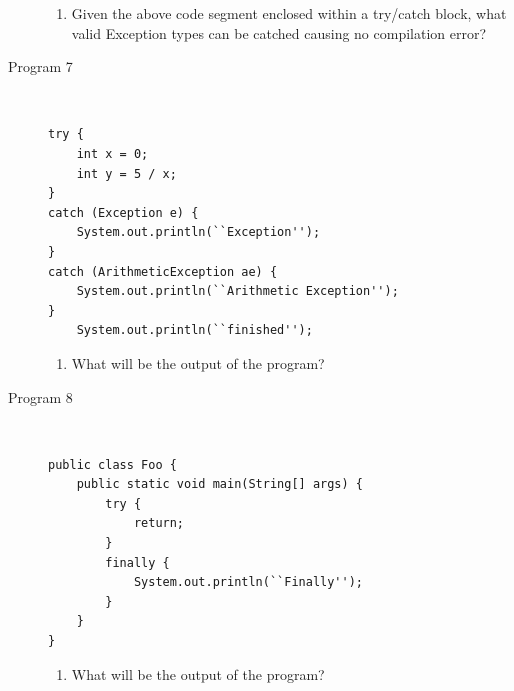 \documentclass[11pt,a4paper]{article}
\def\AnswerBox{\fbox{\begin{minipage}{4in}\hfill\vspace{0.5in}\end{minipage}}}
\begin{document}
\begin{description}
\begin{enumerate}[label=\bfseries Q\arabic*:]\itemsep10pt
\item Given the above code segment enclosed within a try/catch block, what valid Exception types can be catched causing no compilation error? 
\end{enumerate}

\item [Program 7] \
\begin{lstlisting}
try { 
    int x = 0; 
    int y = 5 / x; 
} 
catch (Exception e) {
    System.out.println(``Exception''); 
} 
catch (ArithmeticException ae) {
    System.out.println(``Arithmetic Exception''); 
} 
    System.out.println(``finished'');
\end{lstlisting}

\AnswerBox

\begin{enumerate}[label=\bfseries Q\arabic*:]\itemsep10pt
        \item What will be the output of the program?
    \end{enumerate}

\item [Program 8] \
\begin{lstlisting}
public class Foo {  
    public static void main(String[] args) {
        try { 
            return; 
        } 
        finally {
            System.out.println(``Finally''); 
        } 
    }
}
\end{lstlisting}

\AnswerBox

\begin{enumerate}[label=\bfseries Q\arabic*:]\itemsep10pt
\item What will be the output of the program?
\end{enumerate}
\end{description}
\end{document}

